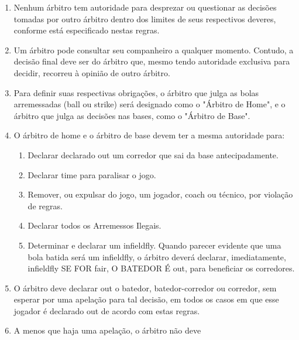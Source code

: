 \begin{enumerate}[label=(\alph*)]
\item   Nenhum árbitro tem autoridade para desprezar ou questionar as decisões tomadas por outro árbitro dentro dos limites de seus respectivos deveres, conforme está especificado nestas regras.

\item  Um árbitro pode consultar seu companheiro a qualquer momento. Contudo, a decisão final deve ser do árbitro que, mesmo tendo autoridade exclusiva para decidir, recorreu à opinião de outro árbitro.
\item  Para definir suas respectivas obrigações, o árbitro que julga as bolas arremessadas (\gls{ball} ou \gls{strike}) será designado como o "Árbitro de Home", e o árbitro que julga as decisões nas bases, como o "Árbitro de Base".

\item  O árbitro de \gls{home} e o árbitro de base devem ter a mesma autoridade para:

	\begin{enumerate}[label=(\arabic*)]
		\item Declarar declarado \gls{out} um corredor que sai da base antecipadamente.
		\item Declarar \gls{time} para paralisar o jogo.
		\item  Remover, ou expulsar do jogo, um jogador, \gls{coach} ou técnico, por violação de regras.
		\item  Declarar todos os Arremessos Ilegais.
		\item  Determinar e declarar um \gls{infieldfly}. Quando parecer evidente que uma bola batida será um \gls{infieldfly}, o árbitro deverá declarar, imediatamente, \gls{infieldfly} SE FOR \gls{fair}, O BATEDOR É \gls{out}, para beneficiar os corredores.
	\end{enumerate}

\item  O árbitro deve declarar \gls{out} o batedor, batedor-corredor ou corredor, sem esperar por uma apelação para tal decisão, em todos os casos em que esse jogador é declarado \gls{out} de acordo com estas regras.
\item   A menos que haja uma apelação, o árbitro não deve


\end{enumerate}
